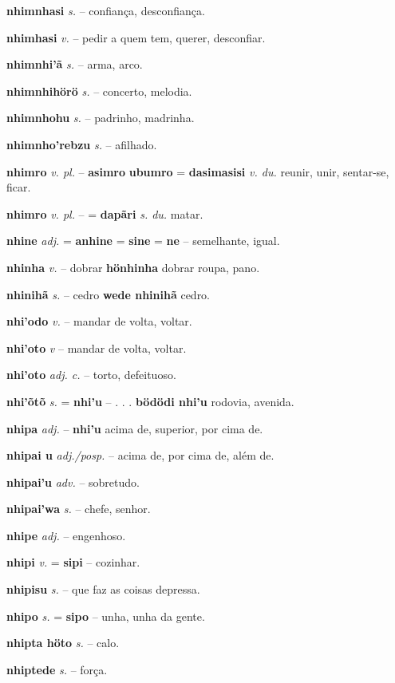 \textbf{nhimnhasi} \textit{s.} -- confiança, desconfiança.

\textbf{nhimhasi} \textit{v.} -- pedir a quem tem, querer, desconfiar.

\textbf{nhimnhi'ã} \textit{s.} -- arma, arco.

\textbf{nhimnhihörö} \textit{s.} -- concerto, melodia.

\textbf{nhimnhohu} \textit{s.} -- padrinho, madrinha.

\textbf{nhimnho'rebzu} \textit{s.} -- afilhado.

\textbf{nhimro} \textit{v. pl.} -- \textbf{asimro} \textbf{ubumro} = \textbf{dasimasisi} \textit{v. du.} reunir, unir, sentar-se, ficar.

\textbf{nhimro} \textit{v. pl.} -- = \textbf{dapãri} \textit{s. du.} matar.

\textbf{nhine} \textit{adj.} = \textbf{anhine} = \textbf{sine} = \textbf{ne} -- semelhante, igual.

\textbf{nhinha} \textit{v.} -- dobrar  \textbf{hönhinha} dobrar roupa, pano.

\textbf{nhinihã} \textit{s.} -- cedro  \textbf{wede nhinihã} cedro.

\textbf{nhi'odo} \textit{v.} -- mandar de volta, voltar.

\textbf{nhi'oto} \textit{v} -- mandar de volta, voltar.

\textbf{nhi'oto} \textit{adj. c.} -- torto, defeituoso.

\textbf{nhi'õtõ} \textit{s.} = \textbf{nhi'u} -- . . .  \textbf{bödödi nhi'u} rodovia, avenida.

\textbf{nhipa} \textit{adj.} -- \textbf{nhi'u} acima de, superior, por cima de.

\textbf{nhipai u} \textit{adj./posp.} -- acima de, por cima de, além de.

\textbf{nhipai'u} \textit{adv.} -- sobretudo.

\textbf{nhipai'wa} \textit{s.} -- chefe, senhor.

\textbf{nhipe} \textit{adj.} -- engenhoso.

\textbf{nhipi} \textit{v.} = \textbf{sipi} -- cozinhar.

\textbf{nhipisu} \textit{s.} -- que faz as coisas depressa.

\textbf{nhipo} \textit{s.} = \textbf{sipo} -- unha, unha da gente.

\textbf{nhipta höto} \textit{s.} -- calo.

\textbf{nhiptede} \textit{s.} -- força.

